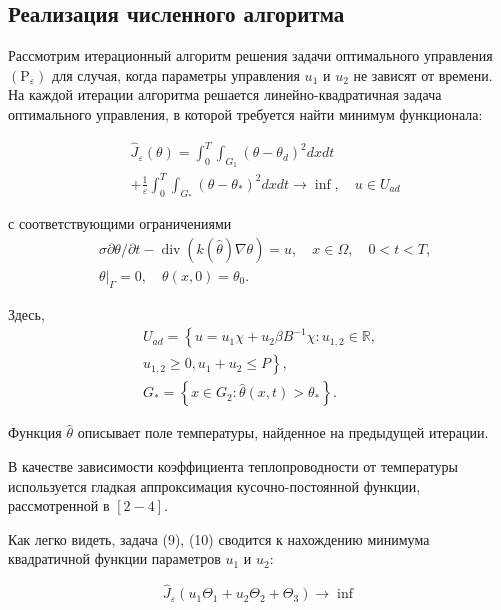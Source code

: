 \subsection{Реализация численного алгоритма}

Рассмотрим итерационный алгоритм решения задачи оптимального управления
$\left(\mathrm{P}_{\varepsilon}\right)$ для случая, когда параметры управления
$u_{1}$ и $u_{2}$ не зависят от времени.
На каждой итерации алгоритма
решается линейно-квадратичная задача оптимального управления, в которой требуется найти минимум функционала:

\[
    \begin{aligned}
        &\widehat{J}_{\varepsilon}(\theta)=\int_{0}^{T} \int_{G_{1}}\left(\theta-\theta_{d}\right)^{2} d x d t \\
        &+\frac{1}{\varepsilon} \int_{0}^{T}
        \int_{G_{*}}\left(\theta-\theta_{*}\right)^{2} d x d t \rightarrow \inf , \quad u \in U_{a d}
    \end{aligned}
\]

с соответствующими ограничениями
\[
    \begin{aligned}
        &\sigma \partial \theta / \partial t-\operatorname{div}(k(\widehat{\theta})
        \nabla \theta)=u, \quad x \in \Omega, \quad 0<t<T, \\
        &\left.\theta\right|_{\Gamma}=0, \quad \theta(x, 0)=\theta_{0} .
    \end{aligned}
\]

Здесь,
\[
    \begin{gathered}
        U_{a d}=\left\{u=u_{1} \chi+u_{2} \beta B^{-1} \chi: u_{1,2} \in \mathbb{R},\right. \\
        \left.u_{1,2} \geq 0, u_{1}+u_{2} \leq P\right\}, \\
        G_{*}=\left\{x \in G_{2}: \hat{\theta}(x, t)>\theta_{*}\right\} .
    \end{gathered}
\]

Функция $\widehat{\theta}$ описывает поле температуры, найденное на предыдущей итерации.

В качестве зависимости коэффициента теплопроводности от температуры используется
гладкая аппроксимация кусочно-постоянной функции, рассмотренной в $[2-4]$.

Как легко видеть, задача (9), (10) сводится к нахождению минимума
квадратичной функции параметров $u_{1}$ и $u_{2}$:


\[
    \widehat{J}_{\varepsilon}\left(u_{1} \Theta_{1}+u_{2} \Theta_{2}+\Theta_{3}\right) \rightarrow \inf
\]

